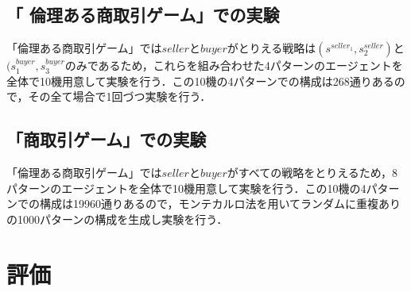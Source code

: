 \documentclass[twocolumn, a4j]{article}
\begin{document}
\subsection{「 倫理ある商取引ゲーム」での実験}
「倫理ある商取引ゲーム」では$ seller $と$ buyer $がとりえる戦略は$ (s^{seller_1}, s^{seller}_2) $と$ (s^{buyer}_1, s^{buyer}_3 $のみであるため，これらを組み合わせた4パターンのエージェントを全体で10機用意して実験を行う．この10機の4パターンでの構成は268通りあるので，その全て場合で1回づつ実験を行う．

\subsection{「商取引ゲーム」での実験}
「倫理ある商取引ゲーム」では$ seller $と$ buyer $がすべての戦略をとりえるため，8パターンのエージェントを全体で10機用意して実験を行う．この10機の4パターンでの構成は19960通りあるので，モンテカルロ法を用いてランダムに重複ありの1000パターンの構成を生成し実験を行う．

\section{評価}
\end{document}
